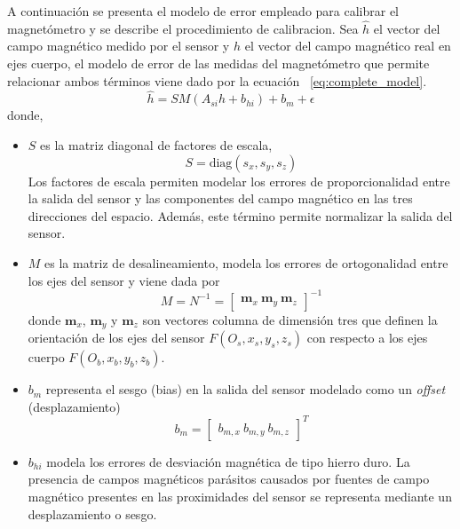\documentclass[a4paper,12pt]{book}
\begin{document}
A continuación se presenta el modelo de error empleado para calibrar el magnetómetro y se describe el procedimiento de calibracion. Sea $\hat{h}$ el vector del campo magnético medido por el sensor y $h$ el vector del campo magnético real en ejes cuerpo, el modelo de error de las medidas del magnetómetro que permite relacionar ambos términos viene dado por la ecuación~ \eqref{eq:complete_model}.
\begin{equation}
\hat{h} = S M(A_{si} h + b_{hi}) + b_m + \epsilon \label{eq:complete_model}
\end{equation}
donde,

\begin{itemize}
    \item $S$ es la matriz diagonal de factores de escala,
    \begin{equation}
    S = \text{diag}(s_x, s_y, s_z) \label{eq:scale_factor}
    \end{equation}
    Los factores de escala permiten modelar los errores de proporcionalidad entre la salida del sensor y las componentes del campo magnético en las tres direcciones del espacio. Además, este término permite normalizar la salida del sensor.
    \item $M$ es la matriz de desalineamiento, modela los errores de ortogonalidad entre los ejes del sensor y viene dada por
    \begin{equation}
    M = N^{-1} = \begin{bmatrix} \mathbf{m}_x \ \mathbf{m}_y \ \mathbf{m}_z \end{bmatrix}^{-1} \label{eq:misalignment}
    \end{equation}
    donde $\mathbf{m}_x$, $\mathbf{m}_y$ y $\mathbf{m}_z$ son vectores columna de dimensión tres que definen la orientación de los ejes del sensor $F(O_s, x_s, y_s, z_s)$ con respecto a los ejes cuerpo $F(O_b, x_b, y_b, z_b)$. 
    \item $b_m$ representa el sesgo (bias) en la salida del sensor modelado como un \emph{offset} (desplazamiento)
    \begin{equation}
    b_m = \begin{bmatrix} b_{m,x} \ b_{m,y} \ b_{m,z} \end{bmatrix}^T \label{eq:bias}
    \end{equation}
    \item $b_{hi}$ modela los errores de desviación magnética de tipo hierro duro. La presencia de campos magnéticos parásitos causados por fuentes de campo magnético presentes en las proximidades del sensor se representa mediante un desplazamiento o sesgo.

\end{itemize}
\end{document}
